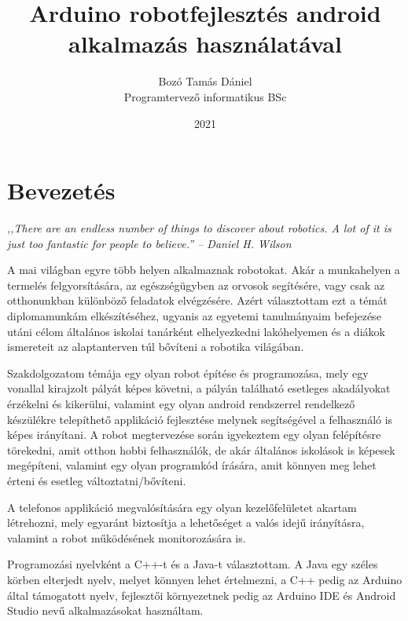 \documentclass[]{thesis-ekf}
\theoremstyle{definition}
\begin{document}
\title{Arduino robotfejlesztés android alkalmazás használatával}
\author{Bozó Tamás Dániel\\Programtervező informatikus BSc}
\date{2021}
\maketitle
\tableofcontents
\chapter*{Bevezetés}
\begin{flushright}
	\emph{,,There are an endless number of things to discover about robotics. A lot of it is just too fantastic for people to believe.'' -- Daniel H. Wilson}
\end{flushright}

A mai világban egyre több helyen alkalmaznak robotokat. Akár a munkahelyen a termelés felgyorsítására, az egészségügyben az orvosok segítésére, vagy csak az otthonunkban különböző feladatok elvégzésére. Azért választottam ezt a témát diplomamunkám elkészítéséhez, ugyanis az egyetemi tanulmányaim befejezése utáni célom általános iskolai tanárként elhelyezkedni lakóhelyemen és a diákok ismereteit az alaptanterven túl bővíteni a robotika világában.

Szakdolgozatom témája egy olyan robot építése és programozása, mely egy vonallal kirajzolt pályát képes követni, a pályán található esetleges akadályokat érzékelni és kikerülni, valamint egy olyan android rendszerrel rendelkező készülékre telepíthető applikáció fejlesztése melynek segítségével a felhasználó is képes irányítani. A robot megtervezése során igyekeztem egy olyan felépítésre törekedni, amit otthon hobbi felhasználók, de akár általános iskolások is képesek megépíteni, valamint egy olyan programkód írására, amit könnyen meg lehet érteni és esetleg változtatni/bővíteni.

A telefonos applikáció megvalósítására egy olyan kezelőfelületet akartam létrehozni, mely egyaránt biztosítja a lehetőséget a valós idejű irányításra, valamint a robot működésének monitorozására is.

Programozási nyelvként a C++-t és a Java-t választottam. A Java egy széles körben elterjedt nyelv, melyet könnyen lehet értelmezni, a C++ pedig az Arduino által támogatott nyelv, fejlesztői környezetnek pedig az Arduino IDE és Android Studio nevű alkalmazásokat használtam.
\end{document}
